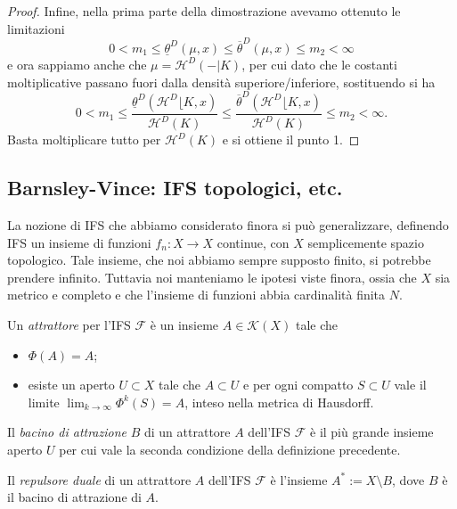 \begin{proof}
	Infine, nella prima parte della dimostrazione avevamo ottenuto le limitazioni $$0<m_{1}\leq\underline\theta^{D}(\mu,x)\leq\overline\theta^{D}(\mu,x)\leq m_{2}<\infty$$ e ora sappiamo anche che $\mu = \mathcal H^{D}(-|K)$, per cui dato che le costanti moltiplicative passano fuori dalla densità superiore/inferiore, sostituendo si ha 
	$$0 < m_{1} \leq \frac{\underline\theta^{D}(\mathcal H^{D}\lfloor K, x)}{\mathcal H^{D}(K)} \leq \frac{\overline\theta^{D}(\mathcal H^{D}\lfloor K, x)}{\mathcal H^{D}(K)} \leq m_{2} < \infty.$$
	Basta moltiplicare tutto per $\mathcal H^{D}(K)$ e si ottiene il punto 1. 
\end{proof}

\subsection{Barnsley-Vince: IFS topologici, etc.}

La nozione di IFS che abbiamo considerato finora si può generalizzare, definendo IFS un insieme di funzioni $f_{n}:X\to X$ continue, con $X$ semplicemente spazio topologico. Tale insieme, che noi abbiamo sempre supposto finito, si potrebbe prendere infinito. 
Tuttavia noi manteniamo le ipotesi viste finora, ossia che $X$ sia metrico e completo e che l'insieme di funzioni abbia cardinalità finita $N$.

\begin{definizione}
	Un \emph{attrattore} per l'IFS $\mathcal F$ è un insieme $A\in\mathcal K(X)$ tale che 
	\begin{itemize}
		\item $\Phi(A) = A$; 
		\item esiste un aperto $U\subset X$ tale che $A\subset U$ e per ogni compatto $S\subset U$ vale il limite $\lim_{k\to\infty}\Phi^{k}(S) = A$, inteso nella metrica di Hausdorff.
	\end{itemize}
\end{definizione}

\begin{definizione}
	Il \emph{bacino di attrazione} $B$ di un attrattore $A$ dell'IFS $\mathcal F$ è il più grande insieme aperto $U$ per cui vale la seconda condizione della definizione precedente. 
\end{definizione}
\begin{definizione}
	Il \emph{repulsore duale} di un attrattore $A$ dell'IFS $\mathcal F$ è l'insieme $A^{*}:=X\setminus B$, dove $B$ è il bacino di attrazione di $A$.
\end{definizione}

